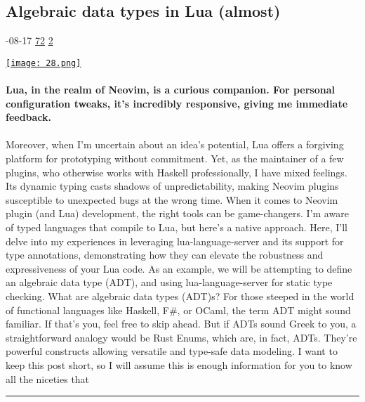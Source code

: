 \documentclass[10pt,a4paper]{article}
\begin{document}
\begin{multicols*}{2}
\begin{minipage}{\linewidth}
\subsection{Algebraic data types in Lua (almost)}
\textsc{\footnotesize
{\scriptsize\faCalendar}-08-17 
{\scriptsize\faThumbsOUp}\space 
\href{http://news.ycombinator.com/item?id=37163742\&utm\_term=comment}{72} 
{\scriptsize\faComments}\space 
\href{http://news.ycombinator.com/item?id=37163742\&utm\_term=comment}{2} 
}
\par\medskip\noindent
\href{https://mrcjkb.dev/posts/2023-08-17-lua-adts.html?utm\_source=hackernewsletter\&utm\_medium=email\&utm\_term=code}{
    \texttt{[image: 28.png]}
}
\end{minipage}
\paragraph{}
\textbf{Lua, in the realm of Neovim, is a curious companion. For personal configuration tweaks, it’s incredibly responsive, giving me immediate feedback.}
\paragraph{}
 Moreover, when I’m uncertain about an idea’s potential, Lua offers a forgiving platform for prototyping without commitment.
Yet, as the maintainer of a few plugins, who otherwise works with Haskell professionally, I have mixed feelings. Its dynamic typing casts shadows of unpredictability, making Neovim plugins susceptible to unexpected bugs at the wrong time.
When it comes to Neovim plugin (and Lua) development, the right tools can be game-changers.
I’m aware of typed languages that compile to Lua, but here’s a native approach.
Here, I’ll delve into my experiences in leveraging
lua-language-server
and its support for type annotations,
demonstrating how they can elevate the robustness and expressiveness of your Lua code.
As an example, we will be attempting to define an algebraic data type (ADT),
and using
lua-language-server for static type checking.
What are algebraic data types (ADT)s?
For those steeped in the world of functional languages like Haskell, F\#, or OCaml, the term ADT might sound familiar. If that’s you, feel free to skip ahead.
But if ADTs sound Greek to you, a straightforward analogy would be Rust Enums, which are, in fact, ADTs. They’re powerful constructs allowing versatile and type-safe data modeling.
I want to keep this post short, so I will assume this is enough information for you to know all the niceties that
\par\noindent\textcolor{red}{\rule{\linewidth}{0.2mm}}
\vfill
\null
\end{multicols*}
\end{document}
